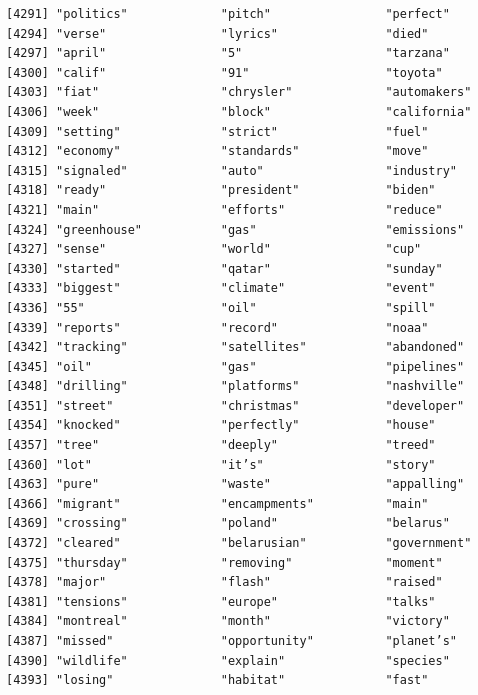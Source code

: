 \documentclass[
  letterpaper,
  DIV=11,
  numbers=noendperiod]{scrartcl}
\begin{document}
\begin{verbatim}
[4291] "politics"             "pitch"                "perfect"             
[4294] "verse"                "lyrics"               "died"                
[4297] "april"                "5"                    "tarzana"             
[4300] "calif"                "91"                   "toyota"              
[4303] "fiat"                 "chrysler"             "automakers"          
[4306] "week"                 "block"                "california"          
[4309] "setting"              "strict"               "fuel"                
[4312] "economy"              "standards"            "move"                
[4315] "signaled"             "auto"                 "industry"            
[4318] "ready"                "president"            "biden"               
[4321] "main"                 "efforts"              "reduce"              
[4324] "greenhouse"           "gas"                  "emissions"           
[4327] "sense"                "world"                "cup"                 
[4330] "started"              "qatar"                "sunday"              
[4333] "biggest"              "climate"              "event"               
[4336] "55"                   "oil"                  "spill"               
[4339] "reports"              "record"               "noaa"                
[4342] "tracking"             "satellites"           "abandoned"           
[4345] "oil"                  "gas"                  "pipelines"           
[4348] "drilling"             "platforms"            "nashville"           
[4351] "street"               "christmas"            "developer"           
[4354] "knocked"              "perfectly"            "house"               
[4357] "tree"                 "deeply"               "treed"               
[4360] "lot"                  "it’s"                 "story"               
[4363] "pure"                 "waste"                "appalling"           
[4366] "migrant"              "encampments"          "main"                
[4369] "crossing"             "poland"               "belarus"             
[4372] "cleared"              "belarusian"           "government"          
[4375] "thursday"             "removing"             "moment"              
[4378] "major"                "flash"                "raised"              
[4381] "tensions"             "europe"               "talks"               
[4384] "montreal"             "month"                "victory"             
[4387] "missed"               "opportunity"          "planet’s"            
[4390] "wildlife"             "explain"              "species"             
[4393] "losing"               "habitat"              "fast"                

\end{verbatim}
\end{document}
